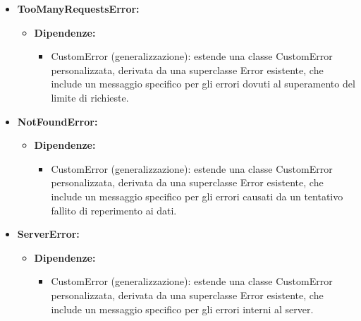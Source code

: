 \begin{itemize}
    \item \textbf{TooManyRequestsError:}
          \begin{itemize}
              \item \textbf{Dipendenze:}
                    \begin{itemize}
                        \item CustomError (generalizzazione): estende una classe CustomError personalizzata,
                              derivata da una superclasse Error esistente, che include un messaggio specifico
                              per gli errori dovuti al superamento del limite di richieste.
                    \end{itemize}
          \end{itemize}

    \item \textbf{NotFoundError:}
          \begin{itemize}
              \item \textbf{Dipendenze:}
                    \begin{itemize}
                        \item CustomError (generalizzazione): estende una classe CustomError personalizzata,
                              derivata da una superclasse Error esistente, che include un messaggio specifico
                              per gli errori causati da un tentativo fallito di reperimento ai dati.
                    \end{itemize}
          \end{itemize}

    \item \textbf{ServerError:}
          \begin{itemize}
              \item \textbf{Dipendenze:}
                    \begin{itemize}
                        \item CustomError (generalizzazione): estende una classe CustomError personalizzata,
                              derivata da una superclasse Error esistente, che include un messaggio specifico
                              per gli errori interni al server.
                    \end{itemize}
          \end{itemize}
\end{itemize}

\pagebreak

